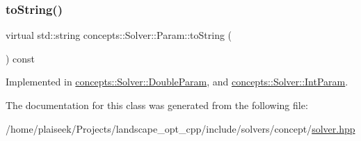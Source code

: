 \subsubsection{\texorpdfstring{to\+String()}{toString()}}
{\footnotesize\ttfamily virtual std\+::string concepts\+::\+Solver\+::\+Param\+::to\+String (\begin{DoxyParamCaption}{ }\end{DoxyParamCaption}) const\hspace{0.3cm}{\ttfamily [pure virtual]}}



Implemented in \hyperlink{classconcepts_1_1_solver_1_1_double_param_a536f65af0681a1e3af0e101f952f717c}{concepts\+::\+Solver\+::\+Double\+Param}, and \hyperlink{classconcepts_1_1_solver_1_1_int_param_a84740f9d96205d4b7fbc1e011a82e08b}{concepts\+::\+Solver\+::\+Int\+Param}.



The documentation for this class was generated from the following file\+:\begin{DoxyCompactItemize}
\item 
/home/plaiseek/\+Projects/landscape\+\_\+opt\+\_\+cpp/include/solvers/concept/\hyperlink{solver_8hpp}{solver.\+hpp}\end{DoxyCompactItemize}
